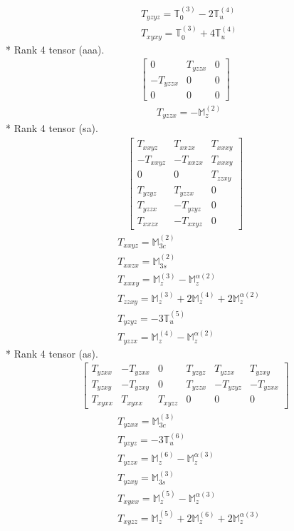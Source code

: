 \documentclass[fleqn,8pt,landscape]{jsarticle}
\begin{document}
\begin{align*}
& T_{yzyz} = \mathbb{T}_{0}^{(3)} - 2 \mathbb{T}_{u}^{(4)} \\
& T_{xyxy} = \mathbb{T}_{0}^{(3)} + 4 \mathbb{T}_{u}^{(4)}
\end{align*}
* Rank 4 tensor (aaa).
\begin{align*}
\begin{bmatrix} 0 & T_{yzzx} & 0 \\ - T_{yzzx} & 0 & 0 \\ 0 & 0 & 0 \end{bmatrix}
\end{align*}
\begin{align*}
& T_{yzzx} = - \mathbb{M}_{z}^{(2)}
\end{align*}
* Rank 4 tensor (sa).
\begin{align*}
\begin{bmatrix} T_{xxyz} & T_{xxzx} & T_{xxxy} \\ - T_{xxyz} & - T_{xxzx} & T_{xxxy} \\ 0 & 0 & T_{zzxy} \\ T_{yzyz} & T_{yzzx} & 0 \\ T_{yzzx} & - T_{yzyz} & 0 \\ T_{xxzx} & - T_{xxyz} & 0 \end{bmatrix}
\end{align*}
\begin{align*}
& T_{xxyz} = \mathbb{M}_{3c}^{(2)} \\
& T_{xxzx} = \mathbb{M}_{3s}^{(2)} \\
& T_{xxxy} = \mathbb{M}_{z}^{(3)} - \mathbb{M}_{z}^{\alpha(2)} \\
& T_{zzxy} = \mathbb{M}_{z}^{(3)} + 2 \mathbb{M}_{z}^{(4)} + 2 \mathbb{M}_{z}^{\alpha(2)} \\
& T_{yzyz} = - 3 \mathbb{T}_{u}^{(5)} \\
& T_{yzzx} = \mathbb{M}_{z}^{(4)} - \mathbb{M}_{z}^{\alpha(2)}
\end{align*}
* Rank 4 tensor (as).
\begin{align*}
\begin{bmatrix} T_{yzxx} & - T_{yzxx} & 0 & T_{yzyz} & T_{yzzx} & T_{yzxy} \\ T_{yzxy} & - T_{yzxy} & 0 & T_{yzzx} & - T_{yzyz} & - T_{yzxx} \\ T_{xyxx} & T_{xyxx} & T_{xyzz} & 0 & 0 & 0 \end{bmatrix}
\end{align*}
\begin{align*}
& T_{yzxx} = \mathbb{M}_{3c}^{(3)} \\
& T_{yzyz} = - 3 \mathbb{T}_{u}^{(6)} \\
& T_{yzzx} = \mathbb{M}_{z}^{(6)} - \mathbb{M}_{z}^{\alpha(3)} \\
& T_{yzxy} = \mathbb{M}_{3s}^{(3)} \\
& T_{xyxx} = \mathbb{M}_{z}^{(5)} - \mathbb{M}_{z}^{\alpha(3)} \\
& T_{xyzz} = \mathbb{M}_{z}^{(5)} + 2 \mathbb{M}_{z}^{(6)} + 2 \mathbb{M}_{z}^{\alpha(3)}
\end{align*}
\end{document}
